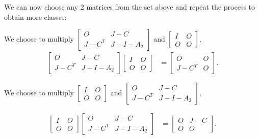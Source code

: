 We can now choose any 2 matrices from the set above and repeat the process to obtain more classes:

We choose to multiply $\begin{bmatrix}
        O&J-C\\J-C^T&J-I-A_2
    \end{bmatrix}$ and $\begin{bmatrix}
        I & O\\O & O
    \end{bmatrix}$,
\begin{align*}
    \begin{bmatrix}
        O&J-C\\J-C^T&J-I-A_2
    \end{bmatrix}
    \begin{bmatrix}
        I & O\\O & O
    \end{bmatrix}
    &= \begin{bmatrix}
        O & O\\J-C^T & O
    \end{bmatrix}.
\end{align*}

We choose to multiply $\begin{bmatrix}
        I&O\\O&O
    \end{bmatrix}$ and $\begin{bmatrix}
        O&J-C\\J-C^T&J-I-A_2
    \end{bmatrix}$,
    
\begin{align*}
    \begin{bmatrix}
        I&O\\O&O
    \end{bmatrix}
    \begin{bmatrix}
        O&J-C\\J-C^T&J-I-A_2
    \end{bmatrix} &=
    \begin{bmatrix}
        O&J-C\\O&O
    \end{bmatrix}.
\end{align*}

